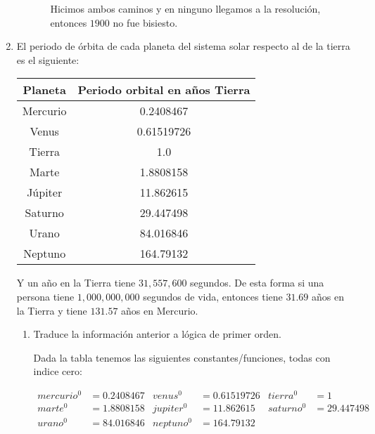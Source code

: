 \documentclass[8pt, letterpaper]{article}
\begin{document}
\begin{enumerate}
\begin{enumerate}
\begin{itemize}
      Hicimos ambos caminos y en ninguno llegamos a la resolución, entonces
      $1900$ no fue bisiesto.
    \end{itemize}
  \end{enumerate}
    \newpage
  \item El periodo de órbita de cada planeta del sistema solar respecto al de la tierra es el siguiente:

    \begin{table}[h]
      \begin{center}
        \begin{tabular}{| c | c |}
          \hline
          \textbf{Planeta} & \textbf{Periodo orbital en años Tierra} \\ \hline
          Mercurio & 0.2408467\\\hline
          Venus & 0.61519726\\\hline
          Tierra & 1.0\\\hline
          Marte & 1.8808158\\\hline
          Júpiter & 11.862615\\\hline
          Saturno & 29.447498\\\hline
          Urano & 84.016846\\\hline
          Neptuno & 164.79132\\\hline
        \end{tabular}
      \end{center} 
    \end{table}

    Y un año en la Tierra tiene $31, 557, 600$ segundos. De esta forma
    si una persona tiene $1, 000, 000, 000$ segundos de vida, entonces
    tiene $31.69$ años en la Tierra y tiene $131.57$ años en Mercurio.

    \begin{enumerate}
    \item Traduce la información anterior a lógica de primer orden.

      \hfill\break
      Dada la tabla tenemos las siguientes constantes/funciones, todas
      con indice cero:

      \begin{align*}
        mercurio^0 &= 0.2408467 & venus^0 &= 0.61519726 & tierra^0&=1\\
        marte^0&=1.8808158 & jupiter^0&=11.862615  & saturno^0 &=29.447498\\
        urano^0&=84.016846 &  neptuno^0 &= 164.79132
      \end{align*}


\end{enumerate}
\end{enumerate}
\end{document}
